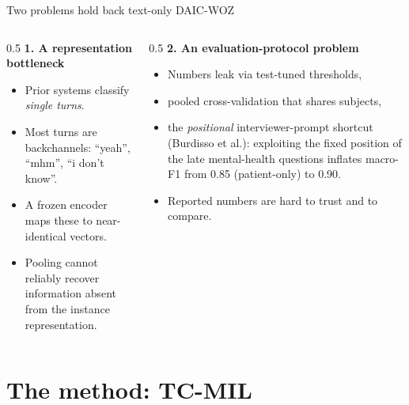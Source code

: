 \documentclass[10pt,aspectratio=169]{beamer}
\newcommand{\bad}[1]{\textcolor{mWarn}{#1}}
\begin{document}
\begin{frame}{Two problems hold back text-only DAIC-WOZ}
  \begin{columns}[T]
    \begin{column}{0.5\textwidth}
      \textbf{1. A representation bottleneck}
      \begin{itemize}
        \item Prior systems classify \emph{single turns}.
        \item Most turns are backchannels: ``yeah'', ``mhm'', ``i don't know''.
        \item A frozen encoder maps these to near-identical vectors.
        \item \bad{Pooling cannot reliably recover information absent from the instance representation.}
      \end{itemize}
    \end{column}
    \begin{column}{0.5\textwidth}
      \textbf{2. An evaluation-protocol problem}
      \begin{itemize}
        \item Numbers leak via test-tuned thresholds,
        \item pooled cross-validation that shares subjects,
        \item the \emph{positional} interviewer-prompt shortcut (Burdisso et al.):
              exploiting the fixed position of the late mental-health questions
              inflates macro-F1 from 0.85 (patient-only) to 0.90.
        \item \bad{Reported numbers are hard to trust and to compare.}
      \end{itemize}
    \end{column}
  \end{columns}
\end{frame}

\section{The method: TC-MIL}
\end{document}
